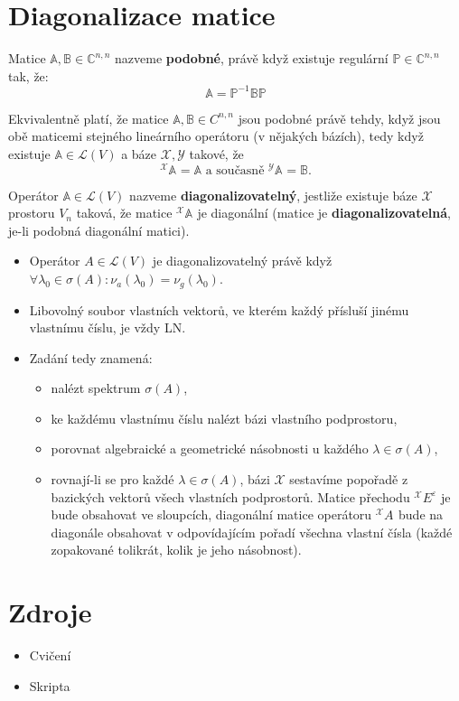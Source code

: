 \documentclass{szzclass}
\newcommand*{\trans}[3]{{}^{#1}#2^{#3}}
\begin{document}
\section{Diagonalizace matice}

\begin{definition}
Matice $\mathbb{A},\mathbb{B}\in \mathbb{C}^{n,n}$ nazveme \textbf{podobné}, právě když existuje regulární $\mathbb{P}\in \mathbb{C}^{n,n}$ tak, že:
\[
  \mathbb{A} = \mathbb{P}^{-1}\mathbb{B}\mathbb{P}
\]
\end{definition}

Ekvivalentně platí, že matice $\mathbb{A}, \mathbb{B} \in C^{n,n}$ jsou podobné právě tehdy, když jsou obě maticemi stejného lineárního operátoru (v nějakých bázích), tedy když existuje $\mathbb{A} \in \mathcal{L}(V)$ a báze $\mathcal{X}, \mathcal{Y}$ takové, že
\[
  \trans{\mathcal{X}}{\mathbb{A}}{} = \mathbb{A}
  \text{ a současně }
  \trans{\mathcal{Y}}{\mathbb{A}}{} = \mathbb{B}.
\]

Operátor $\mathbb{A} \in \mathcal{L}(V)$ nazveme \textbf{diagonalizovatelný}, jestliže existuje báze $\mathcal{X}$ prostoru $V_n$ taková, že matice $\trans{\mathcal{X}}{\mathbb{A}}{}$ je diagonální (matice je \textbf{diagonalizovatelná}, je-li podobná diagonální matici).

\begin{itemize}
\item Operátor $A \in \mathcal{L}(V)$ je diagonalizovatelný právě když $\forall\lambda_0 \in \sigma (A) : \nu_a(\lambda_0) = \nu_g(\lambda_0)$.
\item Libovolný soubor vlastních vektorů, ve kterém každý přísluší jinému vlastnímu číslu, je vždy LN.
\item Zadání  tedy znamená:
  \begin{itemize}
    \item nalézt spektrum $\sigma (A)$,
    \item ke každému vlastnímu číslu nalézt bázi vlastního podprostoru,
    \item porovnat algebraické a geometrické násobnosti u každého $\lambda \in \sigma (A)$,
    \item rovnají-li se pro každé $\lambda \in \sigma (A)$, bázi $\mathcal{X}$ sestavíme popořadě z bazických vektorů všech vlastních podprostorů. Matice přechodu $\trans{\mathcal{X}}{E}{\varepsilon}$ je bude obsahovat ve sloupcích, diagonální matice operátoru $\trans{\mathcal{X}}{A}{}$ bude na diagonále obsahovat v odpovídajícím pořadí všechna vlastní čísla (každé zopakované tolikrát, kolik je jeho násobnost).
  \end{itemize}
\end{itemize}

\section{Zdroje}
\begin{itemize}
\item Cvičení
\item Skripta
\end{itemize}
\end{document}
